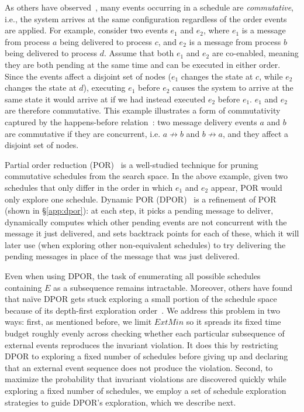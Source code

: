 As others have observed~\cite{godefroid1995partial}, many events occurring in a schedule are {\em commutative}, i.e., the system arrives at the same
configuration regardless of the order events are applied. For example, consider two events $e_1$ and $e_2$, where
$e_1$ is a message from process $a$ being delivered to
process $c$, and $e_2$ is a message from process $b$
being delivered to process $d$. Assume that both $e_1$ and $e_2$ are co-enabled, meaning they are both pending at the same time and can be executed in either order. Since
the events affect a disjoint set of nodes ($e_1$ changes the state at $c$, while $e_2$ changes the state at $d$), executing $e_1$ before $e_2$ causes the system to arrive at the same state it would arrive at if we had instead executed $e_2$ before $e_1$.
$e_1$ and $e_2$ are therefore commutative. This example
illustrates a form of commutativity captured by the happens-before relation~\cite{Lamport:1978:TCO:359545.359563}: two message delivery events
$a$ and $b$ are commutative if they are concurrent, i.e. $a \not\rightarrow b$
and $b \not\rightarrow a$, and they affect a disjoint set of nodes.

Partial order reduction (POR)~\cite{godefroid1995partial,flanagan2005dynamic} is a well-studied technique for pruning commutative schedules from the search space. In the above example, given two schedules that only differ in the order
in which $e_1$ and $e_2$ appear, POR would only explore one schedule. Dynamic POR (DPOR)~\cite{flanagan2005dynamic} is a
refinement of POR (shown in \S\ref{app:dpor}): at each
step, it picks a pending message to deliver, dynamically computes which
other pending events are not concurrent with the message it just delivered,
and sets backtrack points for each of these, which it will later use (when
exploring other non-equivalent schedules) to try delivering the pending
messages in place of the message that was just delivered.

Even when using DPOR, the task of enumerating all possible schedules containing $E$ as a
subsequence remains intractable. Moreover, others have found that na\"ive DPOR
gets stuck exploring a small portion of the schedule space because of its
depth-first exploration order~\cite{lin2009modist}.
We address this problem in two ways: first, as mentioned before, we limit
$ExtMin$ so it spreads its fixed time budget roughly evenly across
checking whether each particular subsequence of external events reproduces the invariant violation. It does this by
restricting DPOR to exploring a fixed number of schedules before
giving up and declaring that an external event sequence does not produce the violation. Second, to maximize the probability that
invariant violations are discovered quickly while exploring a fixed number of
schedules, we employ a set of schedule exploration strategies to guide
DPOR's exploration, which we describe next.

